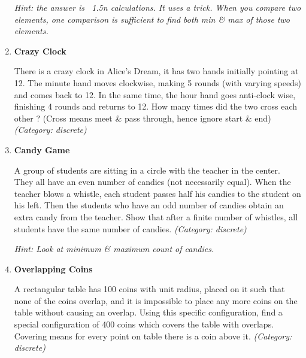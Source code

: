 \begin{enumerate}
\small\emph{Hint: the answer is ~1.5n calculations. It uses a trick. When you compare two elements, one comparison is sufficient to find both min \& max of those two elements.}





\item \textbf{Crazy Clock}

There is a crazy clock in Alice's Dream, it has two hands initially pointing at 12. The minute hand moves clockwise, making 5 rounds (with varying speeds) and comes back to 12. In the same time, the hour hand goes anti-clock wise, finishing 4 rounds and returns to 12. How many times did the two cross each other ? (Cross means meet \& pass through, hence ignore start \& end)
\small\emph{(Category: discrete)}




\item \textbf{Candy Game}

A group of students are sitting in a circle with the teacher in the center. They all have an even number of candies (not necessarily equal). When the teacher blows a whistle, each student passes half his candies to the student on his left. Then the students who have an odd number of candies obtain an extra candy from the teacher. Show that after a finite number of whistles, all students have the same number of candies.
\small\emph{(Category: discrete)}

\small\emph{Hint: Look at minimum \& maximum count of candies.}





\item \textbf{Overlapping Coins}

A rectangular table has 100 coins with unit radius, placed on it such that none of the coins overlap, and it is impossible to place any more coins on the table without causing an overlap. Using this specific configuration, find a special configuration of 400 coins which covers the table with overlaps.
Covering means for every point on table there is a coin above it.
\small\emph{(Category: discrete)}


\end{enumerate}
